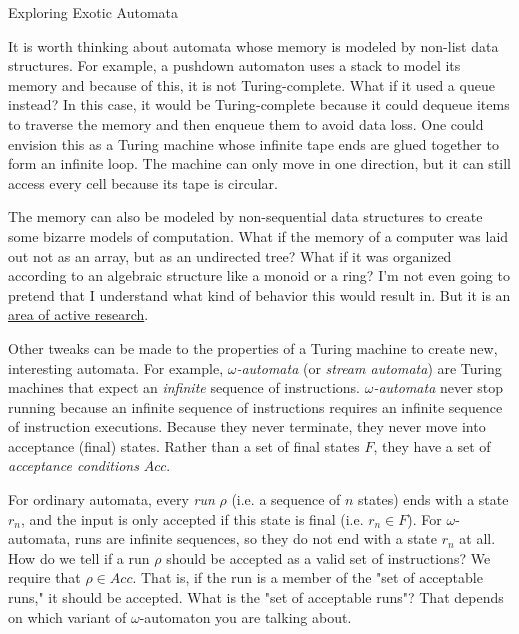 \begin{bluebox}{Exploring Exotic Automata}

    It is worth thinking about automata whose memory is modeled by non-list data structures. For example, a pushdown automaton uses a stack to model its memory and because of this, it is not Turing-complete. What if it used a queue instead? In this case, it would be Turing-complete because it could dequeue items to traverse the memory and then enqueue them to avoid data loss. One could envision this as a Turing machine whose infinite tape ends are glued together to form an infinite loop. The machine can only move in one direction, but it can still access every cell because its tape is circular.
        
    The memory can also be modeled by non-sequential data structures to create some bizarre models of computation. What if the memory of a computer was laid out not as an array, but as an undirected tree? What if it was organized according to an algebraic structure like a monoid or a ring? I'm not even going to pretend that I understand what kind of behavior this would result in. But it is an \underline{area of active research}.


    Other tweaks can be made to the properties of a Turing machine to create new, interesting automata. For example, \textit{$\omega$-automata} (or \textit{stream automata}) are Turing machines that expect an \textit{infinite} sequence of instructions. \textit{$\omega$-automata} never stop running because an infinite sequence of instructions requires an infinite sequence of instruction executions. Because they never terminate, they never move into acceptance (final) states. Rather than a set of final states $F$, they have a set of \textit{acceptance conditions} $Acc$.
        
    For ordinary automata, every \textit{run} $\rho$ (i.e. a sequence of $n$ states) ends with a state $r_n$, and the input is only accepted if this state is final (i.e. $r_n\in F$). For $\omega$-automata, runs are infinite sequences, so they do not end with a state $r_n$ at all. How do we tell if a run $\rho$ should be accepted as a valid set of instructions? We require that $\rho\in Acc$. That is, if the run is a member of the "set of acceptable runs," it should be accepted. What is the "set of acceptable runs"? That depends on which variant of $\omega$-automaton you are talking about.
        

\end{bluebox}
